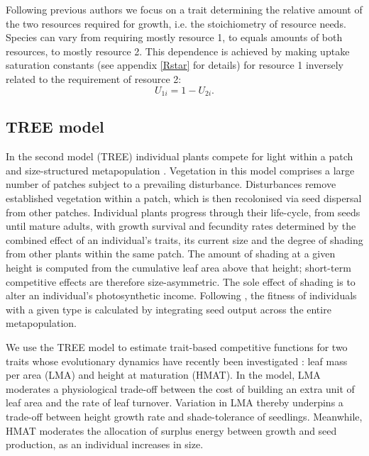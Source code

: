 \documentclass[a4paper,11pt]{article}
\begin{document}
Following previous authors \citep{Tilman-1985, Schreiber-2003, Fox-2008} we
focus on a trait determining the relative amount of the two resources
required for growth, i.e. the stoichiometry of resource needs. Species can
vary from requiring mostly resource 1, to equals amounts of both resources, to
mostly resource 2. This dependence is achieved by making uptake saturation
constants (see appendix  \ref{Rstar} for details) for resource 1 inversely related
to the requirement of resource 2:
\begin{equation}
\label{eq:R3}
U_{1i} = 1-U_{2i}.
\end{equation}

\subsection{TREE model}

In the second model (TREE) individual plants compete for light within a patch
and size-structured metapopulation \citep{Falster-2011, Falster-2015}.
Vegetation in this model comprises a large number of patches subject to a
prevailing disturbance. Disturbances remove established vegetation within a
patch, which is then recolonised via seed dispersal from other patches.
Individual plants progress through their life-cycle, from seeds until mature
adults, with growth survival and fecundity rates determined by the combined
effect of an individual's traits, its current size and the degree of shading
from other plants within the same patch. The amount of shading at a given
height is computed from the cumulative leaf area above that height; short-term
competitive effects are therefore size-asymmetric. The sole effect of shading
is to alter an individual's photosynthetic income. Following
\citep{Falster-2015}, the fitness of individuals with a given type is
calculated by integrating seed output across the entire metapopulation.

We use the TREE model to estimate trait-based competitive functions for
two traits whose evolutionary dynamics have recently been investigated
\citep{Falster-2015}: leaf mass per area (LMA) and height at maturation
(HMAT). In the model, LMA moderates a physiological trade-off between the cost
of building an extra unit of leaf area and the rate of leaf turnover.
Variation in LMA thereby underpins a trade-off between height growth rate and
shade-tolerance of seedlings. Meanwhile, HMAT moderates the allocation of
surplus energy between growth and seed production, as an individual increases in
size.
\end{document}
